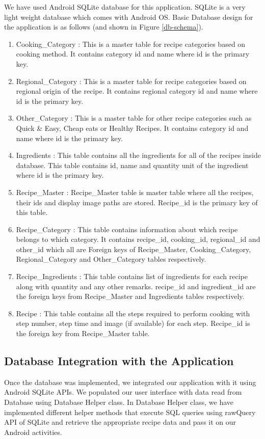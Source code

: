 We have used Android SQLite database for this application. SQLite is a very light weight database which comes with Android OS. Basic Database design for the application is as follows (and shown in Figure \ref{db-schema}).

\begin{enumerate}
\item Cooking\_Category : This is a master table for recipe categories based on cooking method. It contains category id and name where id is the primary key.	


\item Regional\_Category :  This is a master table for recipe categories based on regional origin of the recipe. It contains regional category id and name where id is the primary key. 
\item Other\_Category : This is a master table for other recipe categories such as Quick \& Easy, Cheap eats or Healthy Recipes. It contains category id and name where id is the primary key. 
\item Ingredients : This table contains all the ingredients for all of the recipes inside database. This table contains id, name and quantity unit of the ingredient where id is the primary key.
\item Recipe\_Master : Recipe\_Master table is master table where all the recipes, their ids and display image paths are stored. Recipe\_id is the primary key of this table.
\item Recipe\_Category : This table contains information about which recipe belongs to which category. It contains recipe\_id, cooking\_id, regional\_id and other\_id which all are Foreign keys of Recipe\_Master, Cooking\_Category, Regional\_Category and Other\_Category tables respectively.
\item Recipe\_Ingredients : This table contains list of ingredients for each recipe along with quantity and any other remarks. recipe\_id and ingredient\_id are the foreign keys from Recipe\_Master and Ingredients tables respectively.
\item Recipe : This table contains all the steps required to perform cooking with step number, step time and image (if available) for each step. Recipe\_id is the foreign key from Recipe\_Master table.
\end{enumerate}

\subsection{Database Integration with the Application}
Once the database was implemented, we integrated our application with it using Android SQLite APIs. We populated our user interface with data read from Database using Database Helper class. In Database Helper class, we have implemented different helper methods that execute SQL queries using rawQuery API of SQLite and retrieve the appropriate recipe data and pass it on our Android activities. 

